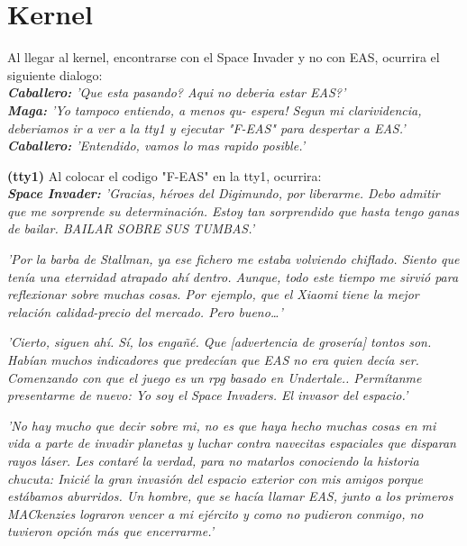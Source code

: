 \documentclass[a4paper,10pt]{article}
\begin{document}
\section{Kernel}
	Al llegar al kernel, encontrarse con el Space Invader y no con EAS, ocurrira el siguiente dialogo:\\
	
	\textit{\textbf{Caballero:} 'Que esta pasando? Aqui no deberia estar EAS?'\\}
	\textit{\textbf{Maga:} 'Yo tampoco entiendo, a menos qu- espera! Segun mi clarividencia, deberiamos ir a ver a la tty1 y ejecutar "F-EAS" para despertar a EAS.'\\}
	\textit{\textbf{Caballero:} 'Entendido, vamos lo mas rapido posible.'\\}
	
	\textbf{(tty1)} Al colocar el codigo "F-EAS" en la tty1, ocurrira:\\
	
	\textit{\textbf{Space Invader:} 'Gracias, héroes del Digimundo, por liberarme. Debo admitir que me sorprende su determinación. Estoy tan sorprendido que hasta tengo ganas de bailar. BAILAR SOBRE SUS TUMBAS.'\\}
	
	\textit{'Por la barba de Stallman, ya ese fichero me estaba volviendo chiflado. Siento que tenía una eternidad atrapado ahí dentro. Aunque, todo este tiempo me sirvió para reflexionar sobre muchas cosas. Por ejemplo, que el Xiaomi tiene la mejor relación calidad-precio del mercado. Pero bueno…'\\}
	
	\textit{'Cierto, siguen ahí. Sí, los engañé. Que [advertencia de grosería] tontos son. Habían muchos indicadores que predecían que EAS no era quien decía ser. Comenzando con que el juego es un rpg basado en Undertale.. Permítanme presentarme de nuevo: Yo soy el Space Invaders. El invasor del espacio.'\\}
	
	\textit{'No hay mucho que decir sobre mi, no es que haya hecho muchas cosas en mi vida a parte de invadir planetas y luchar contra navecitas espaciales que disparan rayos láser. Les contaré la verdad, para no matarlos conociendo la historia chucuta: Inicié la gran invasión del espacio exterior con mis amigos porque estábamos aburridos. Un hombre, que se hacía llamar EAS, junto a los primeros MACkenzies lograron vencer a mi ejército y como no pudieron conmigo, no tuvieron opción más que encerrarme.'\\}
	
\end{document}
